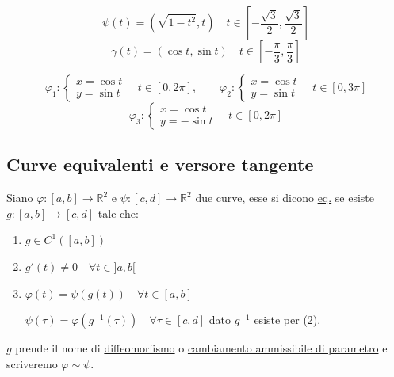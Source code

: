 \[
\psi(t) = (\sqrt{1 - t^2}, t) \quad t \in \left[-\frac{\sqrt{3}}{2}, \frac{\sqrt{3}}{2}\right]
\]
\[
\gamma(t) = (\cos t, \sin t) \quad t \in \left[-\frac{\pi}{3}, \frac{\pi}{3}\right]
\]

\[
\varphi_1 : \begin{cases}
x = \cos t \\
y = \sin t
\end{cases} \quad t \in [0, 2\pi], \qquad
\varphi_2 : \begin{cases}
x = \cos t \\
y = \sin t
\end{cases} \quad t \in [0, 3\pi]
\]
\[
\varphi_3 : \begin{cases}
x = \cos t \\
y = -\sin t
\end{cases} \quad t \in [0, 2\pi]
\]

\begin{center}
\end{center}

\subsection{Curve equivalenti e versore tangente}

\begin{definition}
Siano $\varphi : [a, b] \to \mathbb{R}^2$ e $\psi : [c, d] \to \mathbb{R}^2$ due curve, esse si dicono \underline{eq.} se esiste $g : [a, b] \to [c, d]$ tale che:
\begin{enumerate}
    \item $g \in C^1([a, b])$
    \item $g'(t) \neq 0 \quad \forall t \in ]a, b[$ 
    \item $\varphi(t) = \psi(g(t)) \quad \forall t \in [a, b]$
    
    $\psi(\tau) = \varphi(g^{-1}(\tau)) \quad \forall \tau \in [c, d]$ dato $g^{-1}$ esiste per (2).
\end{enumerate}
$g$ prende il nome di \underline{diffeomorfismo} o \underline{cambiamento ammissibile di parametro} e scriveremo $\varphi \sim \psi$.
\end{definition}

